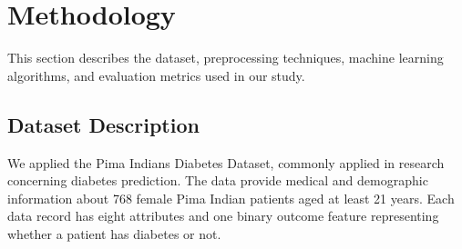 \documentclass[conference]{IEEEtran}
\begin{document}
\section{Methodology}
This section describes the dataset, preprocessing techniques, machine learning algorithms, and evaluation metrics used in our study.

\subsection{Dataset Description}
We applied the Pima Indians Diabetes Dataset, commonly applied in research concerning diabetes prediction. The data provide medical and demographic information about 768 female Pima Indian patients aged at least 21 years. Each data record has eight attributes and one binary outcome feature representing whether a patient has diabetes or not.
\end{document}
